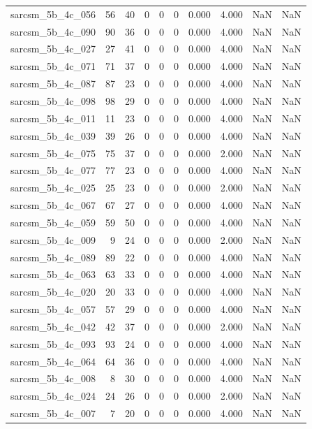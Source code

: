 \documentclass{article}
\begin{document}
\begin{longtable}{lrrrrrrrrr}
sarcsm\_5b\_4c\_056 & 56 & 40 & 0 & 0 & 0 & 0.000 & 4.000 & NaN & NaN \\
sarcsm\_5b\_4c\_090 & 90 & 36 & 0 & 0 & 0 & 0.000 & 4.000 & NaN & NaN \\
sarcsm\_5b\_4c\_027 & 27 & 41 & 0 & 0 & 0 & 0.000 & 4.000 & NaN & NaN \\
sarcsm\_5b\_4c\_071 & 71 & 37 & 0 & 0 & 0 & 0.000 & 4.000 & NaN & NaN \\
sarcsm\_5b\_4c\_087 & 87 & 23 & 0 & 0 & 0 & 0.000 & 4.000 & NaN & NaN \\
sarcsm\_5b\_4c\_098 & 98 & 29 & 0 & 0 & 0 & 0.000 & 4.000 & NaN & NaN \\
sarcsm\_5b\_4c\_011 & 11 & 23 & 0 & 0 & 0 & 0.000 & 4.000 & NaN & NaN \\
sarcsm\_5b\_4c\_039 & 39 & 26 & 0 & 0 & 0 & 0.000 & 4.000 & NaN & NaN \\
sarcsm\_5b\_4c\_075 & 75 & 37 & 0 & 0 & 0 & 0.000 & 2.000 & NaN & NaN \\
sarcsm\_5b\_4c\_077 & 77 & 23 & 0 & 0 & 0 & 0.000 & 4.000 & NaN & NaN \\
sarcsm\_5b\_4c\_025 & 25 & 23 & 0 & 0 & 0 & 0.000 & 2.000 & NaN & NaN \\
sarcsm\_5b\_4c\_067 & 67 & 27 & 0 & 0 & 0 & 0.000 & 4.000 & NaN & NaN \\
sarcsm\_5b\_4c\_059 & 59 & 50 & 0 & 0 & 0 & 0.000 & 4.000 & NaN & NaN \\
sarcsm\_5b\_4c\_009 & 9 & 24 & 0 & 0 & 0 & 0.000 & 2.000 & NaN & NaN \\
sarcsm\_5b\_4c\_089 & 89 & 22 & 0 & 0 & 0 & 0.000 & 4.000 & NaN & NaN \\
sarcsm\_5b\_4c\_063 & 63 & 33 & 0 & 0 & 0 & 0.000 & 4.000 & NaN & NaN \\
sarcsm\_5b\_4c\_020 & 20 & 33 & 0 & 0 & 0 & 0.000 & 4.000 & NaN & NaN \\
sarcsm\_5b\_4c\_057 & 57 & 29 & 0 & 0 & 0 & 0.000 & 4.000 & NaN & NaN \\
sarcsm\_5b\_4c\_042 & 42 & 37 & 0 & 0 & 0 & 0.000 & 2.000 & NaN & NaN \\
sarcsm\_5b\_4c\_093 & 93 & 24 & 0 & 0 & 0 & 0.000 & 4.000 & NaN & NaN \\
sarcsm\_5b\_4c\_064 & 64 & 36 & 0 & 0 & 0 & 0.000 & 4.000 & NaN & NaN \\
sarcsm\_5b\_4c\_008 & 8 & 30 & 0 & 0 & 0 & 0.000 & 4.000 & NaN & NaN \\
sarcsm\_5b\_4c\_024 & 24 & 26 & 0 & 0 & 0 & 0.000 & 2.000 & NaN & NaN \\
sarcsm\_5b\_4c\_007 & 7 & 20 & 0 & 0 & 0 & 0.000 & 4.000 & NaN & NaN \\

\end{longtable}
\end{document}
